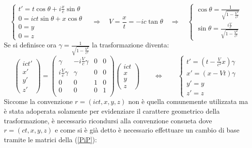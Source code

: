\begin{equation*}
    \begin{cases}
        t'=t\cos\theta+i\frac{x}{c}\sin\theta\\
        0=ict\sin\theta+x\cos\theta\\
        0=y\\
        0=z
       \end{cases}
    \quad \Rightarrow \quad
    V=\frac{x}{t}=-ic\tan\theta \quad \Rightarrow \quad
    \begin{cases}
        \cos\theta=\frac{1}{\sqrt{1-\frac{V^2}{c^2}}}\\
        \sin\theta=\frac{i\frac{V}{c}}{\sqrt{1-\frac{V^2}{c^2}}}
    \end{cases}
\end{equation*}
Se si definisce ora $\gamma=\frac{1}{\sqrt{1-\frac{V^2}{c^2}}}$ la trasformazione diventa:
\begin{equation*}
    \begin{pmatrix}
     ict'\\x'\\y'\\z'
    \end{pmatrix}
    =\begin{pmatrix}
     \gamma & -i\frac{V}{c}\gamma & 0 & 0\\
     i\frac{V}{c}\gamma & \gamma & 0 & 0\\
     0& 0 & 1 & 0\\
     0& 0 & 0 & 1\\
    \end{pmatrix}
    \begin{pmatrix}
     ict\\x\\y\\z
    \end{pmatrix}\qquad
    \Leftrightarrow   \qquad
    \begin{cases}
     t'=(t-\frac{V}{c^2}x)\gamma\\
     x'=(x-Vt)\gamma\\
     y'=y\\
     z'=z
    \end{cases}
 \end{equation*}
 Siccome la convenzione $r=(ict,x,y,z)$ non è quella comunemente utilizzata ma è stata adoperata solamente per evidenziare il carattere geometrico della trasformazione, è necessario ricondursi alla convenzione consueta dove $r=(ct,x,y,z)$ e come si è già detto è necessario effettuare un cambio di base tramite le matrici della (\ref{PiP}):
